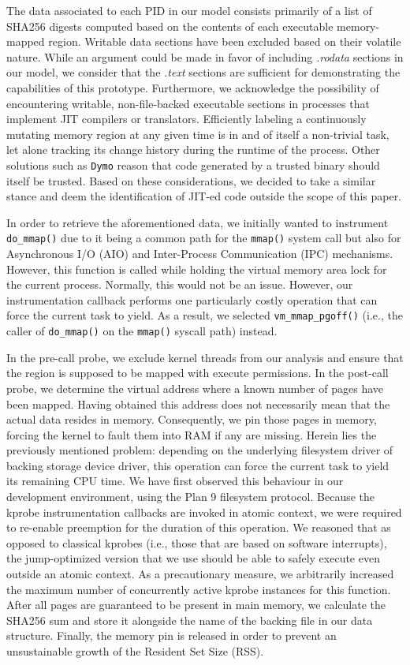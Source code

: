 The data associated to each PID in our model consists primarily of a list of
SHA256 digests computed based on the contents of each executable memory-mapped
region. Writable data sections have been excluded based on their volatile
nature. While an argument could be made in favor of including \textit{.rodata}
sections in our model, we consider that the \textit{.text} sections are
sufficient for demonstrating the capabilities of this prototype. Furthermore, we
acknowledge the possibility of encountering writable, non-file-backed executable
sections in processes that implement JIT compilers or translators. Efficiently
labeling a continuously mutating memory region at any given time is in and of
itself a non-trivial task, let alone tracking its change history during the
runtime of the process. Other solutions such as \texttt{Dymo}
\cite{gilbert2011dymo} reason that code generated by a trusted binary should
itself be trusted. Based on these considerations, we decided to take a similar
stance and deem the identification of JIT-ed code outside the scope of this
paper.

In order to retrieve the aforementioned data, we initially wanted to instrument
\texttt{do\_mmap()} due to it being a common path for the \texttt{mmap()} system
call but also for Asynchronous I/O (AIO) and Inter-Process Communication (IPC)
mechanisms. However, this function is called while holding the virtual memory
area lock for the current process. Normally, this would not be an issue.
However, our instrumentation callback performs one particularly costly operation
that can force the current task to yield. As a result, we selected
\texttt{vm\_mmap\_pgoff()} (i.e., the caller of \texttt{do\_mmap()} on the
\texttt{mmap()} syscall path) instead.

In the pre-call probe, we exclude kernel threads from our analysis and ensure
that the region is supposed to be mapped with execute permissions. In the
post-call probe, we determine the virtual address where a known number of pages
have been mapped. Having obtained this address does not necessarily mean that
the actual data resides in memory. Consequently, we pin those pages in memory,
forcing the kernel to fault them into RAM if any are missing. Herein lies the
previously mentioned problem: depending on the underlying filesystem driver of
backing storage device driver, this operation can force the current task to
yield its remaining CPU time. We have first observed this behaviour in our
development environment, using the Plan 9 filesystem protocol. Because the
kprobe instrumentation callbacks are invoked in atomic context, we were required
to re-enable preemption for the duration of this operation. We reasoned that as
opposed to classical kprobes (i.e., those that are based on software
interrupts), the jump-optimized version that we use should be able to safely
execute even outside an atomic context. As a precautionary measure, we
arbitrarily increased the maximum number of concurrently active kprobe instances
for this function. After all pages are guaranteed to be present in main memory,
we calculate the SHA256 sum and store it alongside the name of the backing file
in our data structure. Finally, the memory pin is released in order to prevent
an unsustainable growth of the Resident Set Size (RSS).

